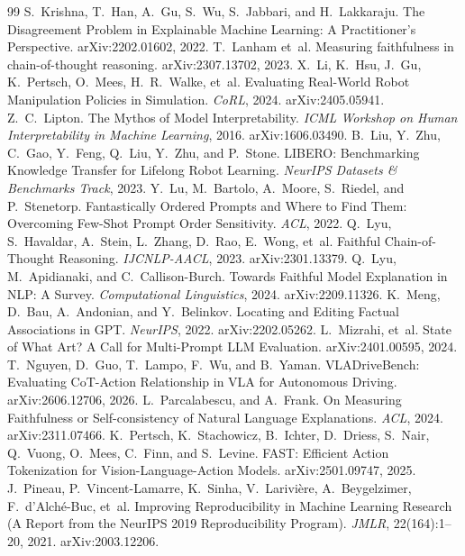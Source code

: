 \begin{thebibliography}{99}
 S.~Krishna, T.~Han, A.~Gu, S.~Wu, S.~Jabbari, and H.~Lakkaraju. The Disagreement Problem in Explainable Machine Learning: A Practitioner's Perspective. arXiv:2202.01602, 2022.
 T.~Lanham et~al. Measuring faithfulness in chain-of-thought reasoning. arXiv:2307.13702, 2023.
 X.~Li, K.~Hsu, J.~Gu, K.~Pertsch, O.~Mees, H.~R.~Walke, et~al. Evaluating Real-World Robot Manipulation Policies in Simulation. \emph{CoRL}, 2024. arXiv:2405.05941.
 Z.~C.~Lipton. The Mythos of Model Interpretability. \emph{ICML Workshop on Human Interpretability in Machine Learning}, 2016. arXiv:1606.03490.
 B.~Liu, Y.~Zhu, C.~Gao, Y.~Feng, Q.~Liu, Y.~Zhu, and P.~Stone. {LIBERO}: Benchmarking Knowledge Transfer for Lifelong Robot Learning. \emph{NeurIPS Datasets \& Benchmarks Track}, 2023.
 Y.~Lu, M.~Bartolo, A.~Moore, S.~Riedel, and P.~Stenetorp. Fantastically Ordered Prompts and Where to Find Them: Overcoming Few-Shot Prompt Order Sensitivity. \emph{ACL}, 2022.
 Q.~Lyu, S.~Havaldar, A.~Stein, L.~Zhang, D.~Rao, E.~Wong, et~al. Faithful Chain-of-Thought Reasoning. \emph{IJCNLP-AACL}, 2023. arXiv:2301.13379.
 Q.~Lyu, M.~Apidianaki, and C.~Callison-Burch. Towards Faithful Model Explanation in NLP: A Survey. \emph{Computational Linguistics}, 2024. arXiv:2209.11326.
 K.~Meng, D.~Bau, A.~Andonian, and Y.~Belinkov. Locating and Editing Factual Associations in GPT. \emph{NeurIPS}, 2022. arXiv:2202.05262.
 L.~Mizrahi, et~al. State of What Art? A Call for Multi-Prompt LLM Evaluation. arXiv:2401.00595, 2024.
 T.~Nguyen, D.~Guo, T.~Lampo, F.~Wu, and B.~Yaman. {VLADriveBench}: Evaluating CoT-Action Relationship in VLA for Autonomous Driving. arXiv:2606.12706, 2026.
 L.~Parcalabescu, and A.~Frank. On Measuring Faithfulness or Self-consistency of Natural Language Explanations. \emph{ACL}, 2024. arXiv:2311.07466.
 K.~Pertsch, K.~Stachowicz, B.~Ichter, D.~Driess, S.~Nair, Q.~Vuong, O.~Mees, C.~Finn, and S.~Levine. FAST: Efficient Action Tokenization for Vision-Language-Action Models. arXiv:2501.09747, 2025.
 J.~Pineau, P.~Vincent-Lamarre, K.~Sinha, V.~Larivière, A.~Beygelzimer, F.~d'Alché-Buc, et~al. Improving Reproducibility in Machine Learning Research (A Report from the NeurIPS 2019 Reproducibility Program). \emph{JMLR}, 22(164):1--20, 2021. arXiv:2003.12206.

\end{thebibliography}
